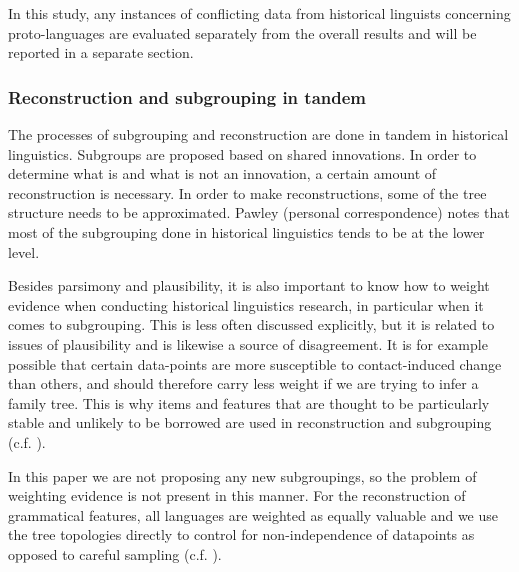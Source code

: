 \documentclass[draft,10pt]{article} %
\begin{document}
In this study, any instances of conflicting data from historical linguists concerning proto-languages are evaluated separately from the overall results and will be reported in a separate section. 


\subsubsection{Reconstruction and subgrouping in tandem}
The processes of subgrouping and reconstruction are done in tandem in historical linguistics. Subgroups are proposed based on shared innovations. In order to determine what is and what is not an innovation, a certain amount of reconstruction is necessary. In order to make reconstructions, some of the tree structure needs to be approximated. Pawley (personal correspondence) notes that most of the subgrouping done in historical linguistics tends to be at the lower level. 

Besides parsimony and plausibility, it is also important to know how to weight evidence when conducting historical linguistics research, in particular when it comes to subgrouping. This is less often discussed explicitly, but it is related to issues of plausibility and is likewise a source of disagreement. It is for example possible that certain data-points are more susceptible to contact-induced change than others, and should therefore carry less weight if we are trying to infer a family tree. This is why items and features that are thought to be particularly stable and unlikely to be borrowed are used in reconstruction and subgrouping (c.f. \citet{pawley_2009_solomons}).

In this paper we are not proposing any new subgroupings, so the problem of weighting evidence is not present in this manner. For the reconstruction of grammatical features, all languages are weighted as equally valuable and we use the tree topologies directly to control for non-independence of datapoints as opposed to careful sampling (c.f. \cite{ross2004morphosyntactic}).
\end{document}
